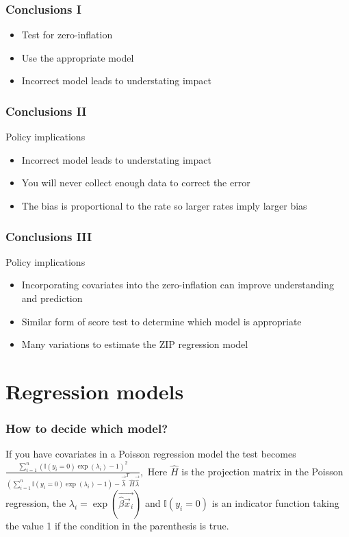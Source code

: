 \documentclass{beamer} %
\theoremstyle{definition} %
\begin{document}
\begin{frame}
\frametitle{Conclusions I}
\begin{itemize}
\item Test for zero-inflation
\item Use the appropriate model
\item Incorrect model leads to understating impact
\end{itemize}
\end{frame}

\begin{frame}
\frametitle{Conclusions II}
Policy implications
\begin{itemize}
\item Incorrect model leads to understating impact 
\item You will never collect enough data to correct the error
\item The bias is proportional to the rate so larger rates imply larger bias 
\end{itemize}
\end{frame}

\begin{frame}
\frametitle{Conclusions III}
Policy implications
\begin{itemize}
\item Incorporating covariates into the zero-inflation can improve understanding and prediction
\item Similar form of score test to determine which model is appropriate
\item Many variations to estimate the ZIP regression model
\end{itemize}
\end{frame}

\section{Regression models}

\begin{frame}
\frametitle{How to decide which model?}
If you have covariates in a Poisson regression model the test becomes
$
\frac{\sum_{i=1}^n(\mathbb{I}(y_i=0)\exp(\lambda_i) - 1)^2}{(\sum_{i=1}^n\mathbb{I}(y_i=0)\exp(\lambda_i) - 1 ) - \vec{\hat{\lambda}}^T \hat{H}\vec{\hat{\lambda}}},
$
Here $\hat{H}$ is the projection matrix in the Poisson regression, the $\lambda_i=\exp(\vec{\hat{\beta}\vec{x}_i})$ and $\mathbb{I}(y_i=0)$ is an indicator function taking the value 1 if the condition in the parenthesis is true. 

\end{frame}
\end{document}
